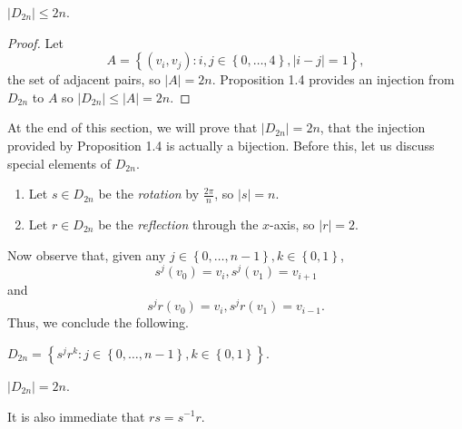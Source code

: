 \documentclass[pmath347]{subfiles}
\begin{document}
    \begin{cor}{}
        $\left| D_{2n} \right| \leq 2n$.
    \end{cor}	

    \begin{proof}
        Let
        \begin{equation*}
            A = \left\lbrace \left( v_i,v_j \right) : i,j\in\left\lbrace 0,\ldots,4 \right\rbrace , \left| i-j \right| = 1 \right\rbrace ,
        \end{equation*}
        the set of adjacent pairs, so $\left| A \right| = 2n$. Proposition 1.4 provides an injection from $D_{2n}$ to $A$ so $\left| D_{2n} \right| \leq \left| A \right| = 2n$.
    \end{proof}

    \np At the end of this section, we will prove that $\left| D_{2n} \right| = 2n$, that the injection provided by Proposition 1.4 is actually a bijection. Before this, let us discuss special elements of $D_{2n}$.
    \begin{enumerate}
        \item Let $s\in D_{2n}$ be the \textit{rotation} by $\frac{2\pi}{n}$, so $\left| s \right| = n$.
        \item Let $r\in D_{2n}$ be the \textit{reflection} through the $x$-axis, so $\left| r \right| = 2$.
    \end{enumerate}
    Now observe that, given any $j\in\left\lbrace 0,\ldots,n-1 \right\rbrace , k\in\left\lbrace 0,1 \right\rbrace$,
    \begin{equation*}
        s^j\left( v_0 \right) = v_i, s^j\left( v_1 \right) = v_{i+1}
    \end{equation*}
    and
    \begin{equation*}
        s^jr\left( v_0 \right) = v_i, s^jr\left( v_1 \right) = v_{i-1}.
    \end{equation*}
    Thus, we conclude the following.

    \begin{prop}{}
        $D_{2n} = \left\lbrace s^jr^k: j\in\left\lbrace 0,\ldots,n-1 \right\rbrace , k\in\left\lbrace 0,1 \right\rbrace  \right\rbrace $.
    \end{prop}

    \begin{cor}{}
        $\left| D_{2n} \right| = 2n$.
    \end{cor}	

    \noindent It is also immediate that $rs = s^{-1} r$. 
\end{document}
